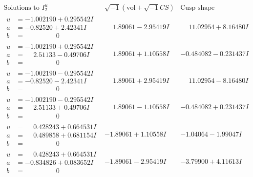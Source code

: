 \documentclass[1p]{elsarticle_modified}
\theoremstyle{definition}
\newcommand{\I}{\sqrt{-1}}
\begin{document}
$$\begin{array}{c|c|c}  
\text{Solutions to }I^u_{2}& \I (\text{vol} + \sqrt{-1}CS) & \text{Cusp shape}\\
 \hline 
\begin{aligned}
u &= -1.002190 + 0.295542 I \\
a &= -0.82520 + 2.42341 I \\
b &= \phantom{-0.000000 } 0\end{aligned}
 & \phantom{-}1.89061 - 2.95419 I & \phantom{-}11.02954 + 8.16480 I \\ \hline\begin{aligned}
u &= -1.002190 + 0.295542 I \\
a &= \phantom{-}2.51133 - 0.49706 I \\
b &= \phantom{-0.000000 } 0\end{aligned}
 & \phantom{-}1.89061 + 1.10558 I & -0.484082 - 0.231437 I \\ \hline\begin{aligned}
u &= -1.002190 - 0.295542 I \\
a &= -0.82520 - 2.42341 I \\
b &= \phantom{-0.000000 } 0\end{aligned}
 & \phantom{-}1.89061 + 2.95419 I & \phantom{-}11.02954 - 8.16480 I \\ \hline\begin{aligned}
u &= -1.002190 - 0.295542 I \\
a &= \phantom{-}2.51133 + 0.49706 I \\
b &= \phantom{-0.000000 } 0\end{aligned}
 & \phantom{-}1.89061 - 1.10558 I & -0.484082 + 0.231437 I \\ \hline\begin{aligned}
u &= \phantom{-}0.428243 + 0.664531 I \\
a &= \phantom{-}0.489858 + 0.681154 I \\
b &= \phantom{-0.000000 } 0\end{aligned}
 & -1.89061 + 1.10558 I & -1.04064 - 1.99047 I \\ \hline\begin{aligned}
u &= \phantom{-}0.428243 + 0.664531 I \\
a &= -0.834826 + 0.083652 I \\
b &= \phantom{-0.000000 } 0\end{aligned}
 & -1.89061 - 2.95419 I & -3.79900 + 4.11613 I \\ \hline\begin{aligned}

\end{aligned}
\end{array}$$
\end{document}
